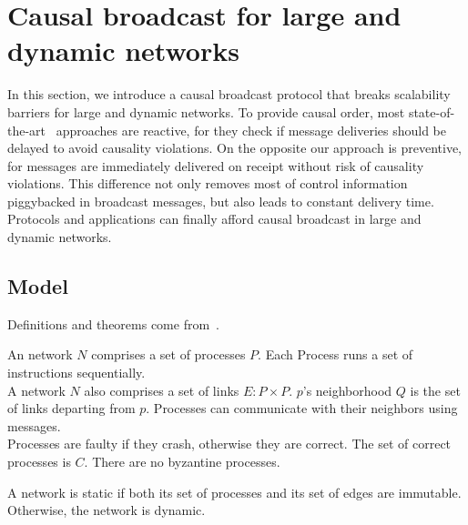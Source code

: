 
\section{Causal broadcast for large and dynamic networks}
\label{sec:proposal}

In this section, we introduce a causal broadcast protocol that breaks
scalability barriers for large and dynamic networks. 
To provide causal order, most
state-of-the-art~\cite{almeida2008interval,birman1987reliable,fidge1988timestamps,hadzilacos1993fault,mattern1989virtual,mostefaoui2017probabilistic,singhal1992efficient}
approaches are reactive, for they check if message deliveries should be delayed
to avoid causality violations. On the opposite our approach is preventive, for
messages are immediately delivered on receipt without risk of causality
violations. This difference not only removes most of control information
piggybacked in broadcast messages, but also leads to constant delivery
time. Protocols and applications can finally afford causal broadcast in large
and dynamic networks. 


\subsection{Model}

Definitions and theorems come from~\cite{hadzilacos1994modular}.

\begin{definition}
  An  network $N$ comprises a set of processes $P$. Each Process
  runs a set of
  instructions sequentially. \\
  A network $N$ also comprises a set of links $E: P \times P$. $p$'s
  neighborhood $Q$ is the set of links departing from $p$. Processes can
  communicate with their
  neighbors using messages. \\
  Processes are faulty if they crash, otherwise they are correct. The set of
  correct processes is $C$. There are no byzantine processes.
\end{definition}

\begin{definition}
  A network is static if both its set of processes and its set of edges are
  immutable. Otherwise, the network is dynamic.
\end{definition}

